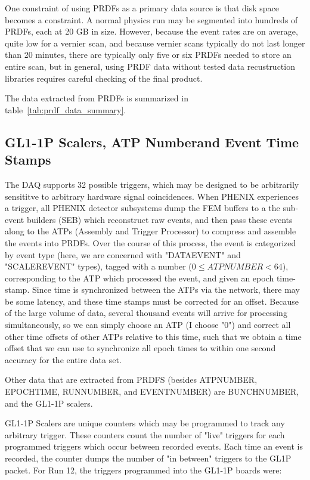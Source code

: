 One constraint of using PRDFs as a primary data source is that disk space
becomes a constraint. A normal physics run may be segmented into hundreds of
PRDFs, each at 20 GB in size. However, because the event rates are on average,
quite low for a vernier scan, and because vernier scans typically do not last
longer than 20 minutes, there are typically only five or six PRDFs needed to
store an entire scan, but in general, using PRDF data without tested data
recustruction libraries requires careful checking of the final product.

The data extracted from PRDFs is summarized in table~\ref{tab:prdf_data_summary}.


\subsection{GL1-1P Scalers, ATP Numberand Event Time Stamps}
The DAQ supports 32 possible triggers, which may be designed to be arbitrarily
sensititve to arbitrary hardware signal coincidences. When PHENIX experiences a
trigger, all PHENIX detector subsystems dump the FEM buffers to a the sub-event
builders (SEB) which reconstruct raw events, and then pass these events along to
the ATPs (Assembly and Trigger Processor) to compress and assemble the events
into PRDFs. Over the course of this process, the event is categorized by event
type (here, we are concerned with "DATAEVENT" and "SCALEREVENT" types), tagged
with a number ($0 \leq ATPNUMBER < 64$), corresponding to the ATP which
processed the event, and given an epoch time-stamp. Since time is synchronized
between the ATPs via the network, there may be some latency, and these time
stamps must be corrected for an offset.  Because of the large volume of data,
several thousand events will arrive for processing simultaneously, so we can
simply choose an ATP (I choose "0") and correct all other time offsets of other
ATPs relative to this time, such that we obtain a time offset that we can use to
synchronize all epoch times to within one second accuracy for the entire data
set.

Other data that are extracted from PRDFS (besides ATPNUMBER, EPOCHTIME,
RUNNUMBER, and EVENTNUMBER) are BUNCHNUMBER, and the GL1-1P scalers.

GL1-1P Scalers are unique counters which may be programmed to track any
arbitrary trigger. These counters count the number of "live" triggers for each
programmed triggers which occur between recorded events. Each time an event is
recorded, the counter dumps the number of "in between" triggers to the GL1P
packet. For Run 12, the triggers programmed into the GL1-1P boards were:

